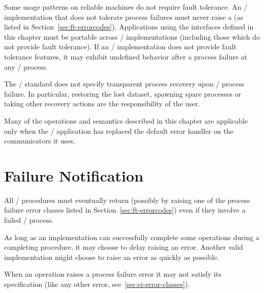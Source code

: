 \par Some usage patterns on reliable machines do not
require fault tolerance. An \MPI/ implementation that does not
tolerate process failures must never raise a 
(as listed in Section~\ref{sec:ft-errorcodes}). Applications
using the interfaces defined in this chapter must be portable across
\MPI/ implementations (including those which do not provide
fault tolerance). If an \MPI/ implementation does not provide fault
tolerance features, it may exhibit undefined behavior after a process
failure at any \MPI/ process.

\begin{users}
The \MPI/ standard does not specify transparent process recovery upon \MPI/ process failure.
In particular, restoring the lost dataset, spawning spare processes
or taking other recovery actions are the responsibility of the user.

Many of the operations and semantics described in
this chapter are applicable only when the \MPI/ application has replaced
the default error handler  on the communicators
it uses.
\end{users}

\section{Failure Notification}
\label{sec:ft-notification}

\par All \MPI/ procedures must eventually return (possibly by raising one of the process
failure error classes listed in Section~\ref{sec:ft-errorcodes}) even if they involve a failed \MPI/ process.

\begin{implementors}
As long as an implementation can successfully complete some operations during
a completing procedure, it may choose to delay raising an error. Another valid
implementation might choose to raise an error as quickly as possible.
\end{implementors}

\par When an operation raises a process failure error it may not satisfy its
specification (like any other error, see~\ref{sec:ei-error-classes}).


